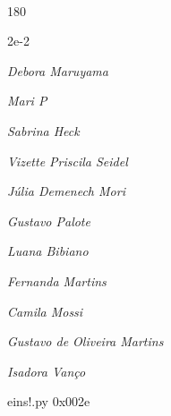 \documentclass[12pt]{article}
\begin{document}
	\hfill	  	  


\pagebreak			

	\ 
	\vfill
	\begin{turn}{180}	
		\begin{minipage}{\textwidth}
		  	\ttfamily %
			\centering
			{\Huge 2e-2}
		  
			\hfill
		  
			

\textit{\small Debora Maruyama}

\textit{\small Mari P}

\textit{\small Sabrina Heck}

\textit{\small Vizette Priscila Seidel}

\textit{\small Júlia Demenech Mori}

\textit{\small Gustavo Palote}

\textit{\small Luana Bibiano}

\textit{\small Fernanda Martins}

\textit{\small Camila Mossi}

\textit{\small Gustavo de Oliveira Martins}

\textit{\small Isadora Vanço}

\bigskip

eins!.py
0x002e


		\end{minipage}	
	\end{turn}
	\vfill
	\

\pagebreak
\end{document}
